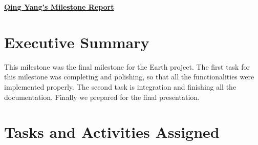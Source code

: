 \begin{center}
{\large\textbf{\underline{{Qing Yang's Milestone Report}}}}
\end{center}

\section*{Executive Summary}

This milestone was the final milestone for the Earth project. The first task for this milestone was completing and polishing, so that all the functionalities were implemented properly. The second task is integration and finishing all the documentation. Finally we prepared for the final presentation.

\section*{Tasks and Activities Assigned}

